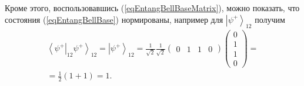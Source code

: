 Кроме этого, воспользовавшись (\ref{eqEntangBellBaseMatrix}), можно
показать, что состояния (\ref{eqEntangBellBase}) нормированы, например
для $\left|\psi^{+}\right>_{12}$ получим 
\begin{eqnarray}
\left<\psi^{+}\right|_{12}\left.\psi^{+}\right>_{12} = 
  \left|\psi^{+}\right>_{12} = 
  \frac{1}{\sqrt{2}} \frac{1}{\sqrt{2}}
  \left(
  \begin{array}{cccc}
    0 & 1 & 1 & 0
  \end{array}
  \right)   
  \left(
  \begin{array}{c}
    0 \\
    1 \\
    1 \\
    0
  \end{array}
  \right) = 
\nonumber \\
=
  \frac{1}{2}\left(1 + 1\right) = 1.
\nonumber 
\end{eqnarray}
